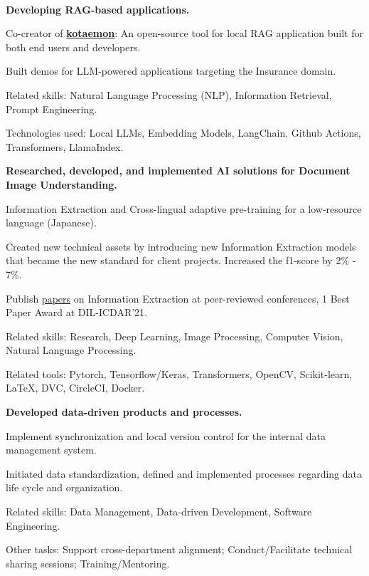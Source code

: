 \\
\vspace{-.2em}
\begin{xitemize}
    \item \textbf{Developing RAG-based applications.}
    \begin{zitemize}
        \item Co-creator of \href{https://github.com/Cinnamon/kotaemon}{\textbf{kotaemon}}: An
        open-source tool for local RAG application built for both end users and developers.
        \item Built demos for LLM-powered applications targeting the Insurance domain.
        \item Related skills: Natural Language Processing (NLP), Information Retrieval, Prompt Engineering.
        \item Technologies used: Local LLMs, Embedding Models, LangChain, Github Actions, Transformers, LlamaIndex.
    \end{zitemize}
    \item \textbf{Researched, developed, and implemented AI solutions for Document Image Understanding.}
    \begin{zitemize}
        \item Information Extraction and Cross-lingual adaptive pre-training for a
        low-resource language (Japanese).
        \item Created new technical assets by introducing new Information Extraction models that
        became the new standard for client projects. Increased the f1-score by 2\% - 7\%.
        \item Publish \href{https://scholar.google.com/citations?user=\gscholarid}{papers} on
        Information Extraction at peer-reviewed conferences, 1 Best Paper Award
        at DIL-ICDAR'21.
        \item Related skills: Research, Deep Learning, Image Processing, Computer Vision, Natural Language Processing.
        \item Related tools: Pytorch, Tensorflow/Keras, Transformers, OpenCV, Scikit-learn, \LaTeX, DVC, CircleCI, Docker.
    \end{zitemize}
    \item \textbf{Developed data-driven products and processes.}
    \begin{zitemize}
        \item Implement synchronization and local version control for the internal
        data management system.
        \item Initiated data standardization, defined and implemented processes regarding data life cycle and organization.
        \item Related skills: Data Management, Data-driven Development, Software Engineering.
    \end{zitemize}
    \item Other tasks: Support cross-department alignment; Conduct/Facilitate technical sharing sessions; Training/Mentoring.
\end{xitemize}

